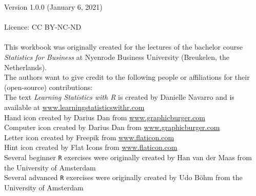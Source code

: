 \thispagestyle{emptyhead}

\vspace*{\fill} 

{\fontsize{8}{10}\selectfont

Version 1.0.0 (January 6, 2021) \\
\\
Licence: CC BY-NC-ND \\
\\
This workbook was originally created for the lectures of the bachelor course \textit{Statistics for Business} at Nyenrode Business University (Breukelen, the Netherlands). \\

The authors want to give credit to the following people or affiliations for their (open-source) contributions: \\

The text \textit{Learning Statistics with R} is created by Danielle Navarro and is available at \url{www.learningstatisticswithr.com} \\
Hand icon created by Darius Dan from \url{www.graphicburger.com} \\
Computer icon created by Darius Dan from \url{www.graphicburger.com} \\
Letter icon created by Freepik from \url{www.flaticon.com} \\
Hint icon created by Flat Icons from \url{www.flaticon.com} \\
Several beginner \texttt{R} exercises were originally created by Han van der Maas from the University of Amsterdam \\
Several advanced \texttt{R} exercises were originally created by Udo B{\"o}hm from the University of Amsterdam

}

\clearpage %

